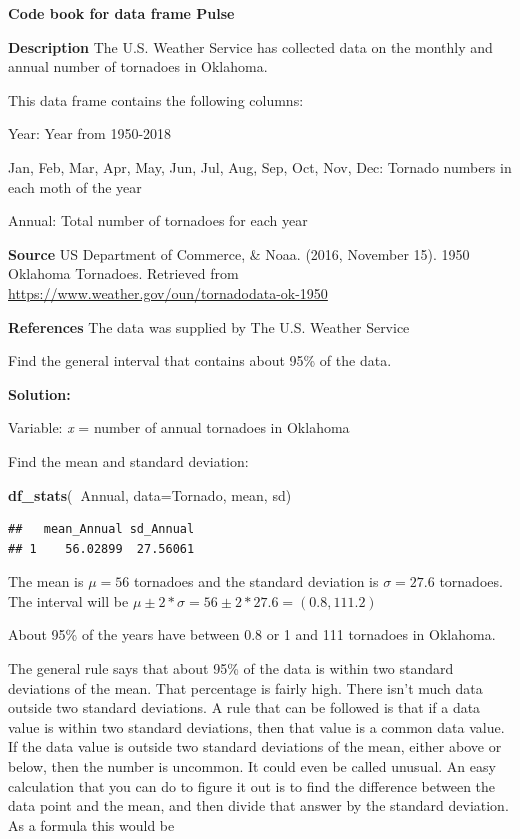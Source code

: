\documentclass[]{book}
\newenvironment{Shaded}{\begin{snugshade}}{\end{snugshade}}
\newcommand{\DataTypeTok}[1]{\textcolor[rgb]{0.13,0.29,0.53}{#1}}
\newcommand{\KeywordTok}[1]{\textcolor[rgb]{0.13,0.29,0.53}{\textbf{#1}}}
\newcommand{\NormalTok}[1]{#1}
\newcommand{\OperatorTok}[1]{\textcolor[rgb]{0.81,0.36,0.00}{\textbf{#1}}}
\begin{document}
\textbf{Code book for data frame Pulse}

\textbf{Description}
The U.S. Weather Service has collected data on the monthly and annual number of tornadoes in Oklahoma.

This data frame contains the following columns:

Year: Year from 1950-2018

Jan, Feb, Mar, Apr, May, Jun, Jul, Aug, Sep, Oct, Nov, Dec: Tornado numbers in each moth of the year

Annual: Total number of tornadoes for each year

\textbf{Source}
US Department of Commerce, \& Noaa. (2016, November 15). 1950 Oklahoma Tornadoes. Retrieved from \url{https://www.weather.gov/oun/tornadodata-ok-1950}

\textbf{References}
The data was supplied by The U.S. Weather Service

Find the general interval that contains about 95\% of the data.

\textbf{Solution:}

Variable: \emph{x} = number of annual tornadoes in Oklahoma

Find the mean and standard deviation:

\begin{Shaded}
\begin{Highlighting}[]
\KeywordTok{df_stats}\NormalTok{(}\OperatorTok{~}\NormalTok{Annual, }\DataTypeTok{data=}\NormalTok{Tornado, mean, sd)}
\end{Highlighting}
\end{Shaded}

\begin{verbatim}
##   mean_Annual sd_Annual
## 1    56.02899  27.56061
\end{verbatim}

The mean is \(\mu=56\) tornadoes and the standard deviation is \(\sigma=27.6\) tornadoes. The interval will be \(\mu\pm2*\sigma=56\pm2*27.6=(0.8,111.2)\)

About 95\% of the years have between 0.8 or 1 and 111 tornadoes in Oklahoma.

The general rule says that about 95\% of the data is within two
standard deviations of the mean. That percentage is fairly high. There
isn't much data outside two standard deviations. A rule that can be
followed is that if a data value is within two standard deviations, then
that value is a common data value. If the data value is outside two
standard deviations of the mean, either above or below, then the number
is uncommon. It could even be called unusual. An easy calculation that
you can do to figure it out is to find the difference between the data
point and the mean, and then divide that answer by the standard
deviation. As a formula this would be
\end{document}

